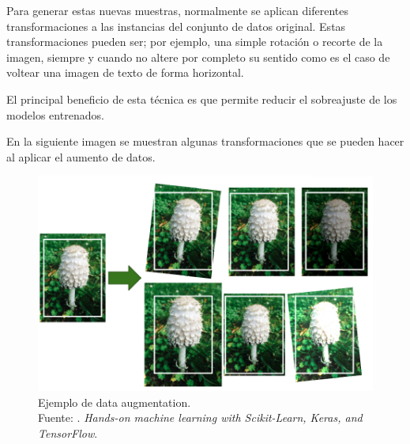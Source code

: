 Para generar estas nuevas muestras, normalmente se aplican diferentes transformaciones a las instancias del conjunto de datos original. Estas transformaciones pueden ser; por ejemplo, una simple rotación o recorte de la imagen, siempre y cuando no altere por completo su sentido como es el caso de voltear una imagen de texto de forma horizontal. 

El principal beneficio de esta técnica es que permite reducir el sobreajuste de los modelos entrenados. 

En la siguiente imagen se muestran algunas transformaciones que se pueden hacer al aplicar el aumento de datos. 

\begin{figure}[H]
	\begin{center}
		\includegraphics[width=1.00\textwidth]{2/figures/data_aug.PNG}
		\caption[Ejemplo de data augmentation]{Ejemplo de data augmentation. \\
		Fuente: \cite{bk_geron2022handml}. \textit{Hands-on machine learning with Scikit-Learn, Keras, and TensorFlow}.}
		\label{2:fig211}
	\end{center}
\end{figure}

